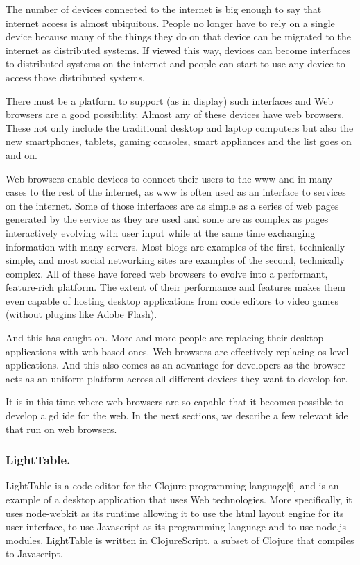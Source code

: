 \documentclass{./llncs2e/llncs}
\begin{document}
	The number of devices connected to the internet is big enough to say that internet access is almost ubiquitous.
	People no longer have to rely on a single device because many of the things they do on that device can be migrated to the internet as distributed systems.
	If viewed this way, devices can become interfaces to distributed systems on the internet and people can start to use any device to access those distributed systems.

	There must be a platform to support (as in display) such interfaces and Web browsers are a good possibility.
	Almost any of these devices have web browsers.
	These not only include the traditional desktop and laptop computers but also the new smartphones, tablets, gaming consoles, smart appliances and the list goes on and on.

	Web browsers enable devices to connect their users to the \ac{www} and in many cases to the rest of the internet, as \ac{www} is often used as an interface to services on the internet.
	Some of those interfaces are as simple as a series of web pages generated by the service as they are used and some are as complex as pages interactively evolving with user input while at the same time exchanging information with many servers.
	Most blogs are examples of the first, technically simple, and most social networking sites are examples of the second, technically complex.
	All of these have forced web browsers to evolve into a performant, feature-rich platform.
	The extent of their performance and features makes them even capable of hosting desktop applications from code editors to video games (without plugins like Adobe Flash).

	And this has caught on.
	More and more people are replacing their desktop applications with web based ones.
	Web browsers are effectively replacing \ac{os}-level applications.
	And this also comes as an advantage for developers as the browser acts as an uniform platform across all different devices they want to develop for.

	It is in this time where web browsers are so capable that it becomes possible to develop a \ac{gd} \ac{ide} for the web.
	In the next sections, we describe a few relevant \ac{ide} that run on web browsers.

\subsubsection{LightTable.}
	LightTable\cite{lighttable2015site} is a code editor for the Clojure programming language[6] and is an example of a desktop application that uses Web technologies.
	More specifically, it uses node-webkit as its runtime allowing it to use the html layout engine for its user interface, to use Javascript as its programming language and to use node.js\cite{tilkov2010node} modules.
	LightTable is written in ClojureScript\cite{10.1109/MIC.2011.148}, a subset of Clojure that compiles to Javascript.
\end{document}
